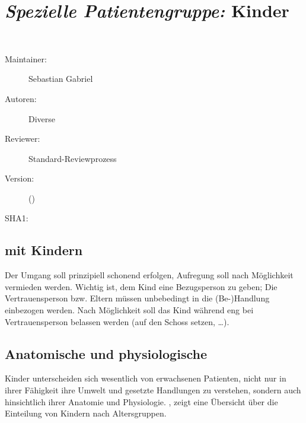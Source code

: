\def\ChapterCode{KIN}
\chapter
[\CO{[KIN]} \emph{Spezielle Patientengruppe:} Kinder]
{\emph{Spezielle Patientengruppe:} Kinder}
\label{chp:KIN}

\ChapterIntro
{%
~~~
}
{%
\begin{description}
  \item[Maintainer:] Sebastian Gabriel
  \item[Autoren:] Diverse
  \item[Reviewer:] Standard-Reviewprozess
  \item[Version:] {\VarDocVersionTypeName} ({\VarDocVersionTypeDescription})
  \item[SHA1:] {\DocGitCommit}
\end{description}

{\TxTeilkapitelAASS}
}

\section{ mit Kindern}
\Text
{{\TxBeschreibung}}%
{%
Der Umgang soll prinzipiell schonend erfolgen, Aufregung
soll nach Möglichkeit vermieden werden. Wichtig ist, dem
Kind eine Bezugsperson zu geben; Die Vertrauensperson bzw.
Eltern müssen unbebedingt in die (Be-)Handlung einbezogen
werden. Nach Möglichkeit soll das Kind während eng bei
Vertrauensperson belassen werden (auf den Schoss setzen,
\ldots). 
\nocite{LPN3}
}%



\section{Anatomische und physiologische  }
\Text
{{\TxBeschreibung}}%
{%
\label{topic:kind-besonderheiten}%
Kinder unterscheiden sich wesentlich von erwachsenen
Patienten, nicht nur in ihrer Fähigkeit ihre Umwelt und
gesetzte Handlungen zu verstehen, sondern auch hinsichtlich
ihrer Anatomie und Physiologie.
, zeigt
eine Übersicht über die Einteilung von Kindern nach
Altersgruppen.

}%

